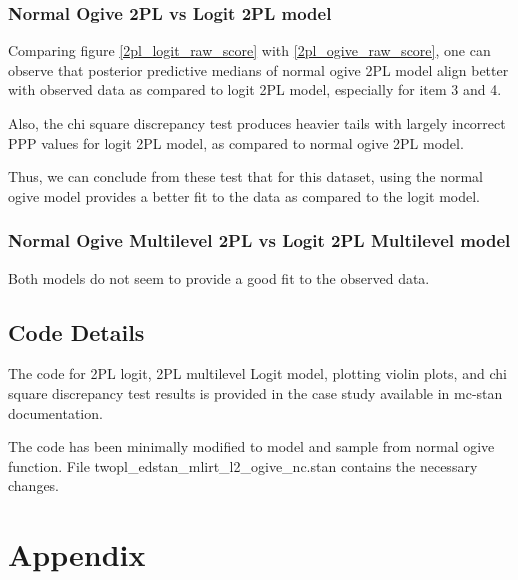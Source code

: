 \documentclass[12pt]{article}
\begin{document}
\subsubsection{Normal Ogive 2PL vs Logit 2PL model}
Comparing figure \ref{2pl_logit_raw_score} with \ref{2pl_ogive_raw_score}, one can observe that posterior predictive medians of normal ogive 2PL model align better with observed data as compared to logit 2PL model, especially for item 3 and 4.

Also, the chi square discrepancy test produces heavier tails with largely incorrect PPP values for logit 2PL model, as compared to normal ogive 2PL model.

Thus, we can conclude from these test that for this dataset, using the normal ogive model provides a better fit to the data as compared to the logit model.

\subsubsection{Normal Ogive Multilevel 2PL vs Logit 2PL Multilevel model}
Both models do not seem to provide a good fit to the observed data.

\subsection{Code Details}

The code for 2PL logit, 2PL multilevel Logit model, plotting violin plots, and chi square discrepancy test results is provided in the case study \cite{furr2016two} available in mc-stan documentation.

The code has been minimally modified to model and sample from normal ogive function.
File twopl\_edstan\_mlirt\_l2\_ogive\_nc.stan contains the necessary changes.





\newpage
\section*{Appendix}
\end{document}
